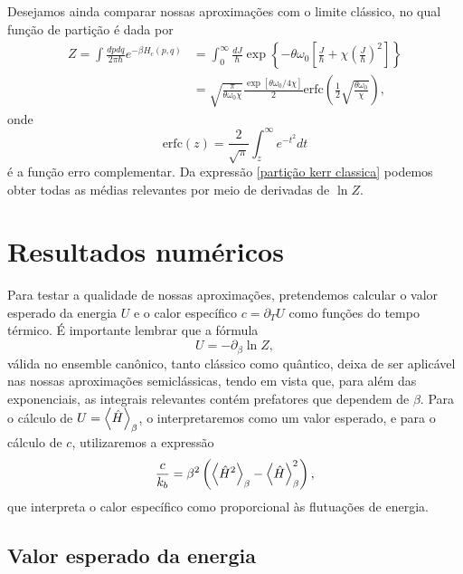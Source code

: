 \documentclass[
	12pt,
	oneside,			%
	a4paper,			%
	english,			%
	brazil				%
	]{abntex2}
\theoremstyle{definition}
\begin{document}
Desejamos ainda comparar nossas aproximações com o limite clássico, no qual função de partição é dada por
\begin{equation}
\label{partição kerr classica}
    \begin{aligned}
        Z = \int \frac{dp dq}{2\pi \hbar}e^{-\beta H_c(p,q)} &= \int_0^\infty \frac{dJ}{\hbar} \exp \left\{ -\theta \omega_0 \left[ \frac{J}{\hbar} + \chi\left(\frac{J}{\hbar} \right)^2\right] \right\} \\ &= \sqrt{\frac{\pi}{\theta \omega_0 \chi}} \frac{\exp \left[ \theta \omega_0/4\chi \right]}{2} \text{erfc} \left( \frac{1}{2} \sqrt{\frac{\theta \omega_0}{\chi}} \right),
    \end{aligned}
\end{equation}
onde
\begin{equation}
    \text{erfc}(z) = \frac{2}{\sqrt{\pi}} \int_z^\infty e^{-t^2} dt
\end{equation}
é a função erro complementar. Da expressão \eqref{partição kerr classica} podemos obter todas as médias relevantes por meio de derivadas de $\ln Z$.

\section{Resultados numéricos}

Para testar a qualidade de nossas aproximações, pretendemos calcular o valor esperado da energia $U$ e o calor específico $c = \partial_T U$ como funções do tempo térmico. É importante lembrar que a fórmula
\begin{equation}
    U = - \partial_\beta \ln Z,
\end{equation}
válida no ensemble canônico, tanto clássico como quântico, deixa de ser aplicável nas nossas aproximações semiclássicas, tendo em vista que, para além das exponenciais, as integrais relevantes contém prefatores que dependem de $\beta$. Para o cálculo de $U = \ev{\hat{H}}_\beta$, o interpretaremos como um valor esperado, e para o cálculo de $c$, utilizaremos a expressão
\begin{equation}
\label{calor específico flutuação}
    \frac{c}{k_b} = \beta^2 \left( \expval{\hat{H}^2}_\beta - \expval{\hat{H}}_\beta^2 \right),
\end{equation}
que interpreta o calor específico como proporcional às flutuações de energia.

\subsection{Valor esperado da energia}
\end{document}
